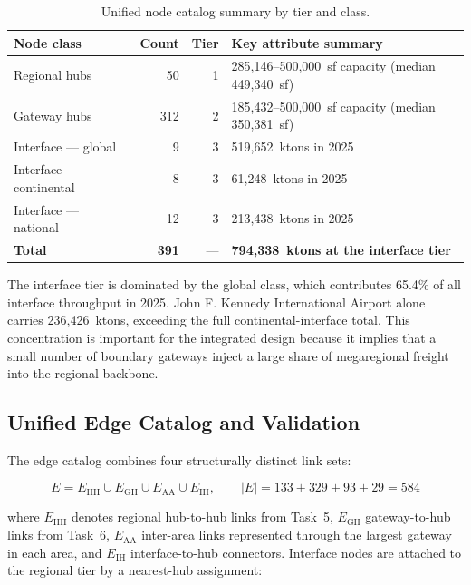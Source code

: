 \begin{table}[htbp]
  \centering
  \caption{Unified node catalog summary by tier and class.}
  \label{tab:task7-nodes}
  \begin{tabular}{lrrl}
    \toprule
    Node class & Count & Tier & Key attribute summary \\
    \midrule
    Regional hubs & 50 & 1 & 285{,}146--500{,}000~sf capacity (median 449{,}340~sf) \\
    Gateway hubs & 312 & 2 & 185{,}432--500{,}000~sf capacity (median 350{,}381~sf) \\
    Interface --- global & 9 & 3 & 519{,}652~ktons in 2025 \\
    Interface --- continental & 8 & 3 & 61{,}248~ktons in 2025 \\
    Interface --- national & 12 & 3 & 213{,}438~ktons in 2025 \\
    \midrule
    \textbf{Total} & \textbf{391} & --- & \textbf{794{,}338~ktons at the interface tier} \\
    \bottomrule
  \end{tabular}
\end{table}

The interface tier is dominated by the global class, which contributes 65.4\% of
all interface throughput in 2025. John F. Kennedy International Airport alone carries
236{,}426~ktons, exceeding the full continental-interface total. This concentration is
important for the integrated design because it implies that a small number of boundary
gateways inject a large share of megaregional freight into the regional backbone.

\subsection{Unified Edge Catalog and Validation}

The edge catalog combines four structurally distinct link sets:

\begin{equation}
  E = E_{\text{HH}} \cup E_{\text{GH}} \cup E_{\text{AA}} \cup E_{\text{IH}},
  \qquad
  |E| = 133 + 329 + 93 + 29 = 584
  \label{eq:task7-edges}
\end{equation}

where $E_{\text{HH}}$ denotes regional hub-to-hub links from Task~5,
$E_{\text{GH}}$ gateway-to-hub links from Task~6,
$E_{\text{AA}}$ inter-area links represented through the largest gateway in each area,
and $E_{\text{IH}}$ interface-to-hub connectors. Interface nodes are attached to the
regional tier by a nearest-hub assignment:

